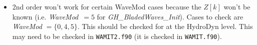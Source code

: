 \begin{itemize}
   \item{2nd order won't work for certain WaveMod cases because the $Z[k]$ won't be known (i.e. \emph{WaveMod}~$= 5$ for \emph{GH\_BladedWaves\_Init}). Cases to check are \emph{WaveMod} $= \{0,4,5\}$. This should be checked for at the HydroDyn level.  This may need to be checked in {\tt WAMIT2.f90} (it is checked in {\tt WAMIT.f90}).}
\end{itemize}


\endinput
\section{Program Outline}
\subsection{WAMIT2\_Init}
\label{sec:WAMIT2Init}
\todo[inline]{Add in a check on the WaveMod.  See WAMIT.f90 line ~894 ({\tt InitInp\%WaveMod} case)}
